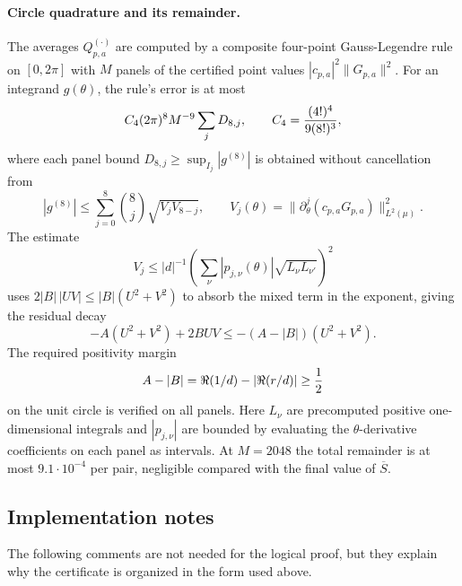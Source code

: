 \paragraph{Circle quadrature and its remainder.}
The averages $Q^{(\cdot)}_{p,a}$ are computed by a composite four-point Gauss-Legendre rule on $[0,2\pi]$ with $M$ panels of the certified point values $|c_{p,a}|^2\|G_{p,a}\|^2$.  For an integrand $g(\theta)$, the rule's error is at most
\[
  C_4(2\pi)^8M^{-9}\sum_jD_{8,j},
  \qquad
  C_4={(4!)^4\over9(8!)^3},
\]
where each panel bound $D_{8,j}\ge\sup_{I_j}|g^{(8)}|$ is obtained without cancellation from
\[
  |g^{(8)}|\le\sum_{j=0}^{8}\binom8j\sqrt{V_jV_{8-j}},
  \qquad
  V_j(\theta)=\|\partial_\theta^j(c_{p,a}G_{p,a})\|_{L^2(\mu)}^2.
\]
The estimate
\[
  V_j\le |d|^{-1}\left(\sum_\nu |p_{j,\nu}(\theta)|\sqrt{L_\nu L_{\nu'}}\right)^2
\]
uses $2|B|\,|UV|\le |B|(U^2+V^2)$ to absorb the mixed term in the exponent, giving the residual decay
\[
  -A(U^2+V^2)+2BUV\le -(A-|B|)(U^2+V^2).
\]
The required positivity margin
\[
  A-|B|=\Re(1/d)-|\Re(r/d)|\ge {1\over2}
\]
on the unit circle is verified on all panels.  Here $L_\nu$ are precomputed positive one-dimensional integrals and $|p_{j,\nu}|$ are bounded by evaluating the $\theta$-derivative coefficients on each panel as intervals.  At $M=2048$ the total remainder is at most $9.1\cdot10^{-4}$ per pair, negligible compared with the final value of $\overline S$.



\subsection{Implementation notes}\label{sec:impl}

The following comments are not needed for the logical proof, but they explain why the certificate is organized in the form used above.

